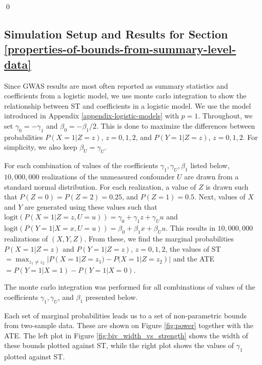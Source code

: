 \documentclass[
]{article}
\theoremstyle{plain}
\begin{document}
\qed

\newpage

\hypertarget{simulation-setup-and-results-for-section}{%
\subsection{\texorpdfstring{Simulation Setup and Results for Section \ref{properties-of-bounds-from-summary-level-data} \label{appendix-sim-results}}{Simulation Setup and Results for Section  }}\label{simulation-setup-and-results-for-section}}

Since GWAS results are most often reported as summary statistics and coefficients from a logistic model, we use monte carlo integration to show the relationship between ST and coefficients in a logistic model. We use the model introduced in Appendix \ref{appendix-logistic-models} with \(p=1\). Throughout, we set \(\gamma_0 = -\gamma_1\) and \(\beta_0 = -\beta_1/2\). This is done to maximize the differences between probabilities \(P(X = 1 | Z = z)\), \(z=0,1,2\), and \(P(Y = 1 | Z = z)\), \(z=0,1,2\). For simplicity, we also keep \(\beta_U = \gamma_U\).

For each combination of values of the coefficients \(\gamma_1, \gamma_U, \beta_1\) listed below, \(10,000,000\) realizations of the unmeasured confounder \(U\) are drawn from a standard normal distribution. For each realization, a value of \(Z\) is drawn such that \(P(Z = 0) = P(Z = 2) = 0.25\), and \(P(Z = 1) = 0.5\). Next, values of \(X\) and \(Y\) are generated using these values such that \(\text{logit}(P(X = 1 | Z = z, U = u)) = \gamma_0 + \gamma_1 z + \gamma_U u\) and \(\text{logit}(P(Y = 1 | X = x, U = u)) = \beta_0 + \beta_1 x + \beta_U u\). This results in \(10,000,000\) realizations of \((X,Y,Z)\). From these, we find the marginal probabilities \(P(X = 1 | Z = z)\) and \(P(Y = 1 | Z = z)\), \(z = 0,1,2\), the values of ST \(=\max_{z_1 \neq z_2} |P(X = 1 | Z = z_1) - P(X = 1 | Z = z_2)|\) and the ATE \(= P(Y = 1 | X = 1) - P(Y = 1 | X = 0)\).

\begin{table}[H]
  \centering
  \caption{The monte carlo integration was performed for all combinations of values of the coefficients $\gamma_1, \gamma_U$, and $\beta_1$ presented below.}
  \label{tab:sim_coefficients}
  
\end{table}

Each set of marginal probabilities leads us to a set of non-parametric bounds from two-sample data. These are shown on Figure \ref{fig:power} together with the ATE. The left plot in Figure \ref{fig:biv_width_vs_strength} shows the width of these bounds plotted against ST, while the right plot shows the values of \(\gamma_1\) plotted against ST.
\end{document}
